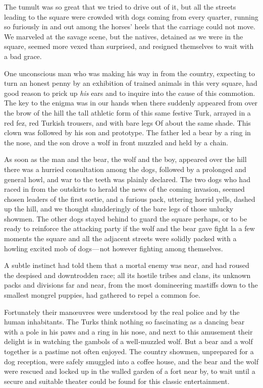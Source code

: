 \documentclass[12pt]{book}
\begin{document}
The tumult was so great that we tried to drive out of it, but all the streets
leading to the square were crowded with dogs coming from every quarter, running
so furiously in and out among the horses’ heels that the carriage could not move.
We marveled at the savage scene, but the natives, detained as we were in the
square, seemed more vexed than surprised, and resigned themselves to wait with
a bad grace.

One unconscious man who was making his way in from the country, expecting
to turn an honest penny by an exhibition of trained animals in this very square, had
good reason to prick up \emph{his} ears and to inquire into the cause of this commotion.
The key to the enigma was in our hands when there suddenly appeared from over
the brow of the hill the tall athletic form of this same festive Turk, arrayed in a
red fez, red Turkish trousers, and with bare legs Of about the same shade. This
clown was followed by his son and prototype. The father led a bear by a ring in
the nose, and the son drove a wolf in front muzzled and held by a chain.

As soon as the man and the bear, the wolf and the boy, appeared over the
hill there was a hurried consultation among the dogs, followed by a prolonged
and general howl, and war to the teeth was plainly declared. The two dogs
who had raced in from the outskirts to herald the news of the coming invasion,
seemed chosen leaders of the first sortie, and a furious pack, uttering horrid yells,
dashed up the hill, and we thought shudderingly of the bare legs of those unlucky
showmen. The other dogs stayed behind to guard the square perhaps, or to be
ready to reinforce the attacking party if the wolf and the bear gave fight la a
few moments the square and all the adjacent streets were solidly packed with a
howling excited mob of dogs — not however fighting among themselves.

A subtle instinct had told them that a mortal enemy was near, and had roused
the despised and downtrodden race; all its hostile tribes and clans, its unknown
packs and divisions far and near, from the most domineering mastiffs down to
the smallest mongrel puppies, had gathered to repel a common foe.

Fortunately their manœuvres were understood by the real police and by the
human inhabitants. The Turks think nothing so fascinating as a dancing bear
with a pole in his paws and a ring in his nose, and next to this amusement their
delight is in watching the gambols of a well‐muzzled wolf. But a bear and a wolf
together is a pastime not often enjoyed. The country showmen, unprepared for
a dog reception, were safely smuggled into a coffee house, and the bear and the
wolf were rescued and locked up in the walled garden of a fort near by, to wait
until a secure and suitable theater could be found for this classic entertainment.
\end{document}
